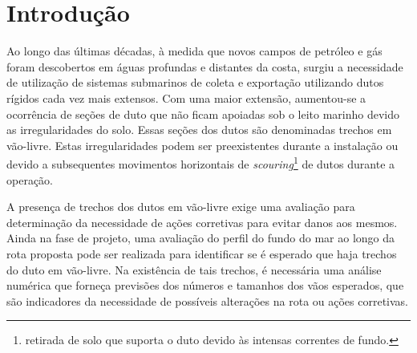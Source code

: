 \chapter{Introdução}






Ao longo das últimas décadas, à medida que novos campos de petróleo e gás foram descobertos em águas profundas e distantes da costa, surgiu a necessidade de utilização de sistemas submarinos de coleta e exportação utilizando dutos rígidos cada vez mais extensos.
Com uma maior extensão, aumentou-se a ocorrência de seções de duto que não ficam apoiadas sob o leito marinho devido as irregularidades do solo. Essas seções dos dutos são denominadas trechos em vão-livre. Estas irregularidades podem ser preexistentes durante a instalação ou devido a subsequentes movimentos horizontais de \textit{scouring}\footnote{retirada de solo que suporta o duto devido às intensas correntes de fundo.} de dutos durante a operação.

A presença de trechos dos dutos em vão-livre exige uma avaliação para determinação da necessidade de ações corretivas para evitar danos aos mesmos.
Ainda na fase de projeto, uma avaliação do perfil do fundo do mar ao longo da rota proposta pode ser realizada para identificar se é esperado que haja trechos do duto em vão-livre.
Na existência de tais trechos, é necessária uma análise numérica que forneça previsões dos números e tamanhos dos vãos esperados, que são indicadores da necessidade de possíveis alterações na rota ou ações corretivas.

